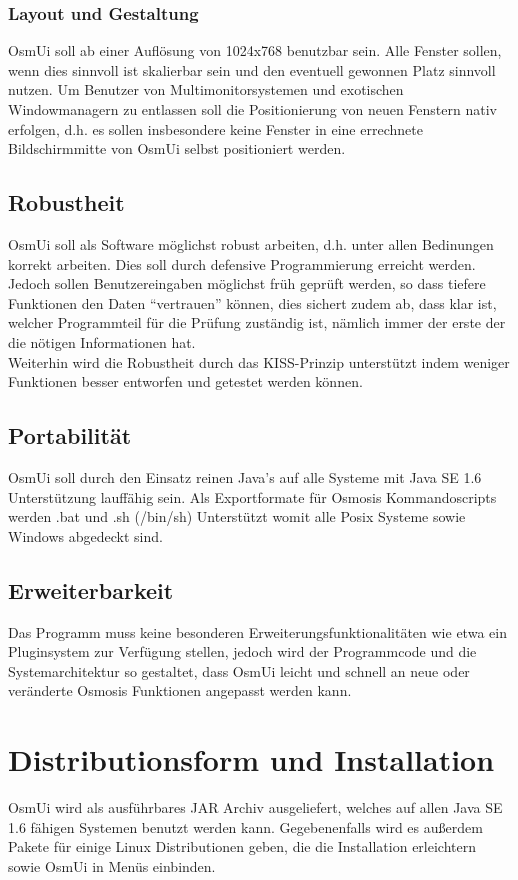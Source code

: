 \documentclass[a4paper,10pt]{scrartcl}
\begin{document}
\subsubsection{Layout und Gestaltung}
OsmUi soll ab einer Auflösung von 1024x768 benutzbar sein. Alle Fenster sollen, wenn dies sinnvoll ist skalierbar sein und den eventuell gewonnen Platz sinnvoll
nutzen. Um Benutzer von Multimonitorsystemen und exotischen Windowmanagern zu entlassen soll die Positionierung von neuen Fenstern nativ erfolgen, d.h. es
sollen insbesondere keine Fenster in eine errechnete Bildschirmmitte von OsmUi selbst positioniert werden.
\subsection{Robustheit}
OsmUi soll als Software möglichst robust arbeiten, d.h. unter allen Bedinungen korrekt arbeiten. Dies soll durch defensive Programmierung erreicht werden.
Jedoch sollen Benutzereingaben möglichst früh geprüft werden, so dass tiefere Funktionen den Daten ``vertrauen'' können, dies sichert zudem ab, dass klar ist, welcher
Programmteil für die Prüfung zuständig ist, nämlich immer der erste der die nötigen Informationen hat.\\
Weiterhin wird die Robustheit durch das KISS-Prinzip unterstützt indem weniger Funktionen besser entworfen und getestet werden können.
\subsection{Portabilität}
OsmUi soll durch den Einsatz reinen Java's auf alle Systeme mit Java SE 1.6 Unterstützung lauffähig sein. Als Exportformate für Osmosis Kommandoscripts
werden .bat und .sh (/bin/sh) Unterstützt womit alle Posix Systeme sowie Windows abgedeckt sind.
\subsection{Erweiterbarkeit}
Das Programm muss keine besonderen Erweiterungsfunktionalitäten wie etwa ein Pluginsystem zur Verfügung stellen, jedoch wird der Programmcode und die Systemarchitektur
so gestaltet, dass OsmUi leicht und schnell an neue oder veränderte Osmosis Funktionen angepasst werden kann.
\section{Distributionsform und Installation}
OsmUi wird als ausführbares JAR Archiv ausgeliefert, welches auf allen Java SE 1.6 fähigen Systemen benutzt werden kann. Gegebenenfalls wird es außerdem Pakete 
für einige Linux Distributionen geben, die die Installation erleichtern sowie OsmUi in Menüs einbinden.
\end{document}
